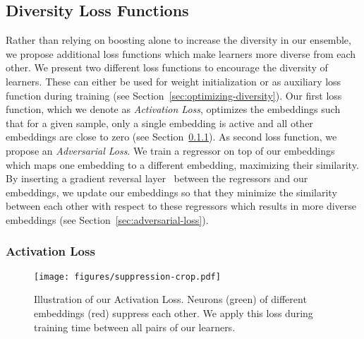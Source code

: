 \documentclass[10pt,journal,compsoc]{IEEEtran}
\begin{document}
\subsection{Diversity Loss Functions}\label{sec:diversity-measurements}

Rather than relying on boosting alone to increase the diversity in our
ensemble, we propose additional loss functions which make learners more
diverse from each other.
We present two different loss functions to encourage the diversity of learners. These can either be used for weight initialization or as auxiliary loss function during training (see Section~\ref{sec:optimizing-diversity}).
Our first loss function, which we denote as \emph{Activation Loss}, optimizes the embeddings such that
for a given sample, only a single embedding is active and all other embeddings are close to zero (see Section~\ref{sec:activation-loss}).
As second loss function, we propose an \emph{Adversarial Loss}. We train a regressor
on top of our embeddings which maps one embedding to a different embedding, maximizing their similarity. 
By inserting a gradient reversal layer~\cite{ganin2016domain} between the regressors and our embeddings, we
update our embeddings so that they minimize the similarity between each other with respect to these regressors 
which results in more diverse embeddings (see Section~\ref{sec:adversarial-loss}).

\subsubsection{Activation Loss}\label{sec:activation-loss}\begin{figure}[t]
\texttt{[image: figures/suppression-crop.pdf]}
\caption{Illustration of our Activation Loss. Neurons (green) of different embeddings (red) suppress each other. 
We apply this loss during training time between all pairs of our learners.}
\label{fig:activation-loss}
\end{figure}
\end{document}
